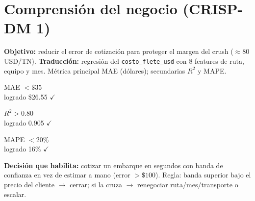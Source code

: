 \documentclass[11pt]{article}
\begin{document}
\section{Comprensión del negocio (CRISP-DM 1)}
\textbf{Objetivo:} reducir el error de cotización para proteger el margen del crush
($\approx$80 USD/TN). \textbf{Traducción:} regresión del \texttt{costo\_flete\_usd}
con 8 features de ruta, equipo y mes. Métrica principal MAE (dólares); secundarias $R^2$ y MAPE.
\begin{center}
\begin{minipage}{0.31\linewidth}\begin{kpi}MAE $<\$35$\\{\small logrado \$26.55 $\checkmark$}\end{kpi}\end{minipage}\hfill
\begin{minipage}{0.31\linewidth}\begin{kpi}{$R^2>0.80$}\\{\small logrado 0.905 $\checkmark$}\end{kpi}\end{minipage}\hfill
\begin{minipage}{0.31\linewidth}\begin{kpi}{MAPE $<20\%$}\\{\small logrado 16\% $\checkmark$}\end{kpi}\end{minipage}
\end{center}
\textbf{Decisión que habilita:} cotizar un embarque en segundos con banda de confianza
en vez de estimar a mano (error $>\$100$). Regla: banda superior bajo el precio del
cliente $\to$ cerrar; si la cruza $\to$ renegociar ruta/mes/transporte o escalar.
\end{document}
